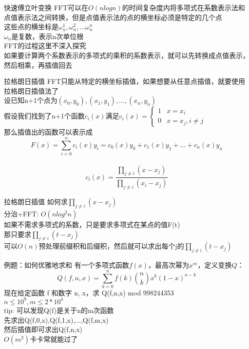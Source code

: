 \documentclass{beamer}
\begin{document}
\begin{frame}{快速傅立叶变换}
FFT可以在$O(nlogn)$的时间复杂度内将多项式在系数表示法和点值表示法之间转换，但是点值表示法的点的横坐标必须是特定的几个点\\
这些点的横坐标是$\omega_n^1,\omega_n^2,...\omega_n^n$\\
$\omega_n$是复数，表示n次单位根\\
FFT的过程这里不深入探究\\
如果要计算两个系数表示的多项式的乘积的系数表示，就可以先转换成点值表示，然后相乘，再插值回去
\end{frame}

\begin{frame}{拉格朗日插值}
FFT只能从特定的横坐标插值，如果想要从任意点插值，就要使用拉格朗日插值法了\\
\pause
设已知n+1个点为$(x_0,y_0),(x_1,y_1),...,(x_n,y_n)$\\
假设我们找到了n+1个函数$c_i(x)$满足$c_i(x)=\left\{
\begin{array}{ll}

1&\text{$x=x_i$}\\

0&\text{$x=x_j,i\neq j$}

\end{array}\right.
$\\
\pause
那么插值出的函数可以表示成$$F(x)=\sum_{i=0}^{n}c_i(x)y_i=c_0(x)y_0+c_1(x)y_1+...+c_n(x)y_n$$\\
\pause
$$c_i(x)=\frac{\prod_{j\neq i}(x-x_j)}{\prod_{j\neq i}(x_i-x_j)}$$

\end{frame}

\begin{frame}{拉格朗日插值}
如何求$\prod_{j\neq i}(x-x_j)$\\
分治+FFT: $O(nlog^2n)$\\
\pause
如果不需求多项式的系数，只是要求多项式在某点的值F(t)\\
那只要求$\prod_{j\neq i}(t-x_j)$\\
可以$O(n)$预处理前缀积和后缀积，然后就可以求出每个j的$\prod_{j\neq i}(t-x_j)$\\
\end{frame}

\begin{frame}{例题：如何优雅地求和}
有一个多项式函数$f(x)$，最高次幂为$x^m$，定义变换$Q$：
$$Q(f,n,x)=\sum_{k=0}^{n}f(k)\binom{n}{k}x^k(1-x)^{n-k}$$
现在给定函数 f 和数字 n, x，求 Q(f,n,x) mod 998244353\\
$n\leqslant 10^9,m\leqslant 2*10^4$\\
tip: 可以发现Q(f)是关于n的m次函数\\
\pause
先求出Q(f,0,x),Q(f,1,x),...,Q(f,m,x)\\
然后插值即可求出Q(f,n,x)\\
$O(m^2)$卡卡常就能过了\\
\end{frame}
\end{document}
